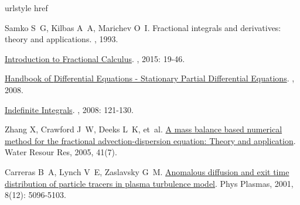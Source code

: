 \begin{thebibliography}{79}
    \providecommand{\natexlab}[1]{#1}
    \providecommand{\url}[1]{#1}
    \expandafter\ifx\csname urlstyle\endcsname\relax\else
      \fi
    \expandafter\ifx\csname href\endcsname\relax
      \DeclareUrlCommand{}
      \def\eprint#1#2{#2}
    \else
      \def\doi#1{\href{https://doi.org/#1}{\nolinkurl{#1}}}
      \let\eprint\href
    \fi
    
    Samko S~G, Kilbas A~A, Marichev O~I.
    \newblock Fractional integrals and derivatives: theory and applications\allowbreak[M].
    , 1993.
    
    \href{https://www.taylorfrancis.com/books/9781482253818/chapters/10.1201/b18503-6}{Introduction to {{Fractional Calculus}}}\allowbreak[M].
    , 2015: 19-46.
    
    \href{https://linkinghub.elsevier.com/retrieve/pii/S1874573308X80167}{Handbook of {{Differential Equations}} - {{Stationary Partial Differential Equations}}}\allowbreak[M].
    , 2008.
    
    \href{https://www.taylorfrancis.com/books/9781584889571/chapters/10.1201/9781584889571-7}{Indefinite {{Integrals}}}\allowbreak[M].
    , 2008: 121-130.
    
    Zhang X, Crawford J~W, Deeks L~K, et~al.
    \newblock \href{http://doi.wiley.com/10.1029/2004WR003818}{A mass balance based numerical method for the fractional advection-dispersion equation: {{Theory}} and application}\allowbreak[J].
    \newblock Water Resour Res, 2005, 41\allowbreak (7).
    
    Carreras B~A, Lynch V~E, Zaslavsky G~M.
    \newblock \href{http://aip.scitation.org/doi/10.1063/1.1416180}{Anomalous diffusion and exit time distribution of particle tracers in plasma turbulence model}\allowbreak[J].
    \newblock Phys Plasmas, 2001, 8\allowbreak (12): 5096-5103.
    

\end{thebibliography}
